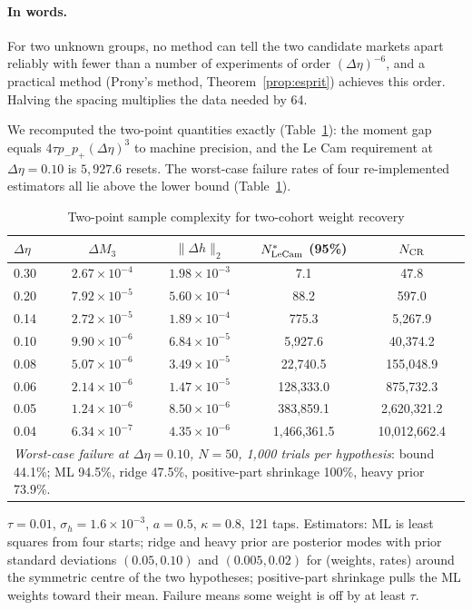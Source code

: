\documentclass[12pt]{article}
\theoremstyle{definition}
\theoremstyle{remark}
\begin{document}
\paragraph{In words.} For two unknown groups, no method can tell the two candidate markets apart reliably with fewer than a number of experiments of order $(\Delta\eta)^{-6}$, and a practical method (Prony's method, Theorem~\ref{prop:esprit}) achieves this order. Halving the spacing multiplies the data needed by 64.

We recomputed the two-point quantities exactly (Table~\ref{tab:lecam}): the moment gap equals $4\tau p_-p_+(\Delta\eta)^3$ to machine precision, and the Le Cam requirement at $\Delta\eta=0.10$ is $5{,}927.6$ resets. The worst-case failure rates of four re-implemented estimators all lie above the lower bound (Table~\ref{tab:lecam}).

\begin{table}[t]\centering\small
\begin{threeparttable}
\caption{Two-point sample complexity for two-cohort weight recovery}\label{tab:lecam}
\begin{tabular}{lcccc}
\toprule
$\Delta\eta$ & $\Delta M_3$ & $\|\Delta h\|_2$ & $N^*_{\rm LeCam}$ (95\%) & $N_{\rm CR}$\\
\midrule
0.30 & $2.67\times10^{-4}$ & $1.98\times10^{-3}$ & 7.1 & 47.8\\
0.20 & $7.92\times10^{-5}$ & $5.60\times10^{-4}$ & 88.2 & 597.0\\
0.14 & $2.72\times10^{-5}$ & $1.89\times10^{-4}$ & 775.3 & 5{,}267.9\\
0.10 & $9.90\times10^{-6}$ & $6.84\times10^{-5}$ & 5{,}927.6 & 40{,}374.2\\
0.08 & $5.07\times10^{-6}$ & $3.49\times10^{-5}$ & 22{,}740.5 & 155{,}048.9\\
0.06 & $2.14\times10^{-6}$ & $1.47\times10^{-5}$ & 128{,}333.0 & 875{,}732.3\\
0.05 & $1.24\times10^{-6}$ & $8.50\times10^{-6}$ & 383{,}859.1 & 2{,}620{,}321.2\\
0.04 & $6.34\times10^{-7}$ & $4.35\times10^{-6}$ & 1{,}466{,}361.5 & 10{,}012{,}662.4\\
\midrule
\multicolumn{5}{p{0.85\textwidth}}{\emph{Worst-case failure at $\Delta\eta=0.10$, $N=50$, 1,000 trials per hypothesis}: bound 44.1\%; ML 94.5\%, ridge 47.5\%, positive-part shrinkage 100\%, heavy prior 73.9\%.}\\
\bottomrule
\end{tabular}
\begin{tablenotes}\footnotesize\item $\tau=0.01$, $\sigma_h=1.6\times10^{-3}$, $a=0.5$, $\kappa=0.8$, 121 taps. Estimators: ML is least squares from four starts; ridge and heavy prior are posterior modes with prior standard deviations $(0.05,0.10)$ and $(0.005,0.02)$ for (weights, rates) around the symmetric centre of the two hypotheses; positive-part shrinkage pulls the ML weights toward their mean. Failure means some weight is off by at least $\tau$.\end{tablenotes}
\end{threeparttable}
\end{table}
\end{document}
